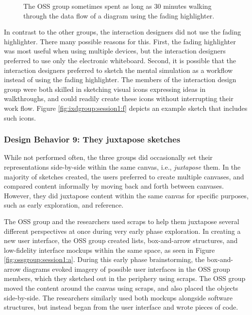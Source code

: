 \begin{figure}%
  \centering
   \caption {The OSS group sometimes spent as long as 30 minutes walking through the data flow of a diagram using the fading highlighter.}
   \label{fig:designbehaviors:mental-simulation-fig}   
\end{figure}%

In contrast to the other groups, the interaction designers did not use the fading highlighter. There many possible reasons for this. First, the fading highlighter was most useful when using multiple devices, but the interaction designers preferred to use only the electronic whiteboard. Second, it is possible that the interaction designers preferred to sketch the mental simulation as a workflow instead of using the fading highlighter. The members of the interaction design group were both skilled in sketching visual icons expressing ideas in walkthroughs, and could readily create these icons without interrupting their work flow. Figure \ref{fig:ixdgroup:session1:f} depicts an example sketch that includes such icons.

\subsubsection{Design Behavior 9: They juxtapose sketches}

While not performed often, the three groups did occasionally set their representations side-by-side within the same canvas, i.e., \textit{juxtapose} them. In the majority of sketches created, the users preferred to create multiple canvases, and compared content informally by moving back and forth between canvases. However, they did juxtapose content within the same canvas for specific purposes, such as early exploration, and reference.

The OSS group and the researchers used scraps to help them juxtapose several different perspectives at once during very early phase exploration. In creating a new user interface, the OSS group created lists, box-and-arrow structures, and low-fidelity interface mockups within the same space, as seen in Figure \ref{fig:ossgroup:session1:a}. During this early phase brainstorming, the box-and-arrow diagrams evoked imagery of possible user interfaces in the OSS group members, which they sketched out in the periphery using scraps. The OSS group moved the content around the canvas using scraps, and also placed the objects side-by-side. The researchers similarly used both mockups alongside software structures, but instead began from the user interface and wrote pieces of code. 


